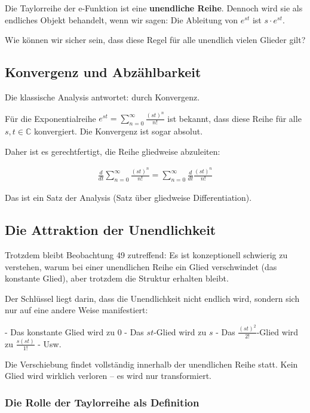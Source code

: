 \documentclass[a4paper,12pt,twoside]{report}
\theoremstyle{definition}
\begin{document}
Die Taylorreihe der e-Funktion ist eine \textbf{unendliche Reihe}. Dennoch wird sie als endliches Objekt behandelt, wenn wir sagen: Die Ableitung von $e^{st}$ ist $s \cdot e^{st}$.

Wie können wir sicher sein, dass diese Regel für alle unendlich vielen Glieder gilt?

\subsection{Konvergenz und Abzählbarkeit}

Die klassische Analysis antwortet: durch Konvergenz. 

Für die Exponentialreihe $e^{st} = \sum_{n=0}^{\infty} \frac{(st)^n}{n!}$ ist bekannt, dass diese Reihe für alle $s, t \in \mathbb{C}$ konvergiert. Die Konvergenz ist sogar absolut.

Daher ist es gerechtfertigt, die Reihe gliedweise abzuleiten:

\begin{align}
	\frac{d}{dt} \sum_{n=0}^{\infty} \frac{(st)^n}{n!} = \sum_{n=0}^{\infty} \frac{d}{dt} \frac{(st)^n}{n!}
\end{align}

Das ist ein Satz der Analysis (Satz über gliedweise Differentiation).

\subsection{Die Attraktion der Unendlichkeit}

Trotzdem bleibt Beobachtung 49 zutreffend: Es ist konzeptionell schwierig zu verstehen, warum bei einer unendlichen Reihe ein Glied verschwindet (das konstante Glied), aber trotzdem die Struktur erhalten bleibt.

Der Schlüssel liegt darin, dass die Unendlichkeit nicht endlich wird, sondern sich nur auf eine andere Weise manifestiert:

- Das konstante Glied wird zu 0
- Das $st$-Glied wird zu $s$
- Das $\frac{(st)^2}{2!}$-Glied wird zu $\frac{s(st)}{1!}$
- Usw.

Die Verschiebung findet vollständig innerhalb der unendlichen Reihe statt. Kein Glied wird wirklich verloren -- es wird nur transformiert.

\subsubsection*{Die Rolle der Taylorreihe als Definition}
\end{document}
